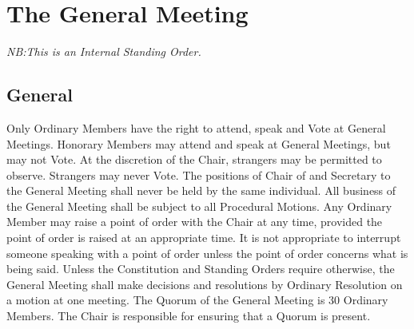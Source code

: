 \chapter{The General Meeting} \label{ch:GM}
\textit{NB:This is an Internal Standing Order.}
\section{General} 
\npara \label{SO:GMAttendance} Only Ordinary Members have the right to attend, speak and Vote at General Meetings. Honorary Members may attend and speak at General Meetings, but may not Vote.  At the discretion of the Chair, strangers may be permitted to observe. Strangers may never Vote.
\npara The positions of Chair of and Secretary to the General Meeting shall never be held by the same individual.
\npara All business of the General Meeting shall be subject to all Procedural Motions.
\npara Any Ordinary Member may raise a point of order with the Chair at any time, provided the point of order is raised at an appropriate time.  It is not appropriate to interrupt someone speaking with a point of order unless the point of order concerns what is being said.
\npara Unless the Constitution and Standing Orders require otherwise, the General Meeting shall make decisions and resolutions by Ordinary Resolution on a motion at one meeting.
\npara The Quorum of the General Meeting is 30 Ordinary Members. The Chair is responsible for ensuring that a Quorum is present.
